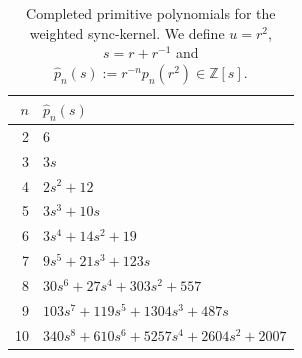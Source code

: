 \begin{table}[H]
\centering
\scriptsize
\setlength{\tabcolsep}{6pt}
\caption{Completed primitive polynomials for the weighted sync-kernel. We define $u=r^2$, $s=r+r^{-1}$ and $\widehat p_n(s):=r^{-n}p_n(r^2)\in\mathbb Z[s]$.}
\label{tab:sync_kernel_weighted_primitive_completed}
\begin{tabular}{r l}
\toprule
$n$ & $\widehat p_n(s)$\\
\midrule
2 & $6$\\
3 & $3 s$\\
4 & $2 s^{2} + 12$\\
5 & $3 s^{3} + 10 s$\\
6 & $3 s^{4} + 14 s^{2} + 19$\\
7 & $9 s^{5} + 21 s^{3} + 123 s$\\
8 & $30 s^{6} + 27 s^{4} + 303 s^{2} + 557$\\
9 & $103 s^{7} + 119 s^{5} + 1304 s^{3} + 487 s$\\
10 & $340 s^{8} + 610 s^{6} + 5257 s^{4} + 2604 s^{2} + 2007$\\
\bottomrule
\end{tabular}
\end{table}
